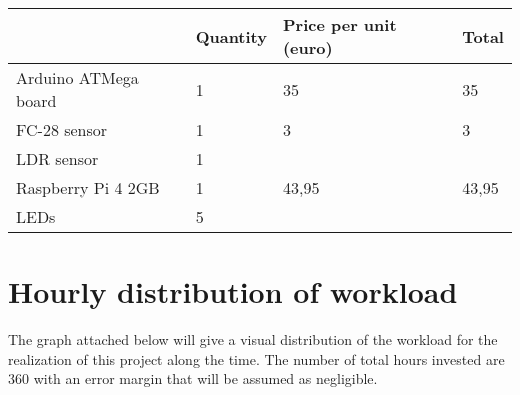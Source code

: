 \begin{table}[]
\begin{tabular}{llll}
\hline
	\rowcolor{lightpurple} 
	& \textbf{Quantity}& \textbf{Price per unit (euro)}& \textbf{Total} \\ \hline
	\rowcolor{lightgray} 
Arduino ATMega board & 1                                        & 35                                                 & 35                                    \\
FC-28 sensor         & 1                                        & 3                                                  & 3                                     \\
	\rowcolor{lightgray} 
LDR sensor	     & 1                                        &                                                    &                                       \\
Raspberry Pi 4 2GB   & 1                                        & 43,95                                              & 43,95                                 \\
\rowcolor{lightgray} 
LEDs                 & 5                                        &                                                    &                                      
\end{tabular}
\end{table}

\section{Hourly distribution of workload}
The graph attached below will give a visual distribution of the workload for the realization of this project along the time. The number of total hours invested are 360 with an error margin that will be assumed as negligible.

